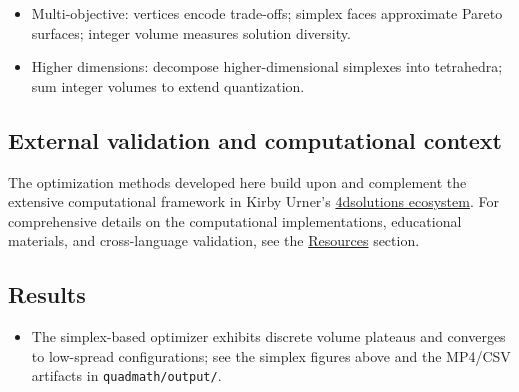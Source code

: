\documentclass[
  10pt,
]{article}
\newcommand{\passthrough}[1]{#1}
\providecommand{\tightlist}{%
  \setlength{\itemsep}{0pt}\setlength{\parskip}{0pt}}
\begin{document}
\begin{itemize}
\tightlist
\item
  Multi-objective: vertices encode trade-offs; simplex faces approximate
  Pareto surfaces; integer volume measures solution diversity.
\item
  Higher dimensions: decompose higher-dimensional simplexes into
  tetrahedra; sum integer volumes to extend quantization.
\end{itemize}

\hypertarget{external-validation-and-computational-context}{%
\subsection{External validation and computational
context}\label{external-validation-and-computational-context}}

The optimization methods developed here build upon and complement the
extensive computational framework in Kirby Urner's
\href{https://github.com/4dsolutions}{4dsolutions ecosystem}. For
comprehensive details on the computational implementations, educational
materials, and cross-language validation, see the
\href{07_resources.md}{Resources} section.

\hypertarget{results}{%
\subsection{Results}\label{results}}

\begin{itemize}
\tightlist
\item
  The simplex-based optimizer exhibits discrete volume plateaus and
  converges to low-spread configurations; see the simplex figures above
  and the MP4/CSV artifacts in
  \passthrough{\lstinline!quadmath/output/!}.
\end{itemize}
\end{document}
